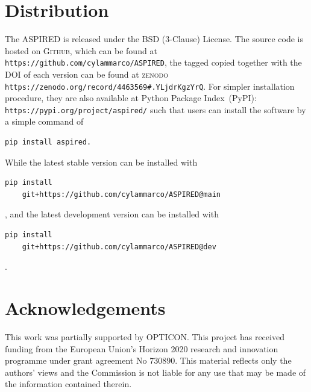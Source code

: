 \documentclass[fleqn,usenatbib]{mnras}
\begin{document}






\section{Distribution}
The \textsc{ASPIRED} is released under the BSD (3-Clause) License. The
source code is hosted on \textsc{Github}, which can be found at
\verb+https://github.com/cylammarco/ASPIRED+, the tagged copied together
with the DOI of each version can be found at
\textsc{zenodo} \verb+https://zenodo.org/record/4463569#.YLjdrKgzYrQ+.
For simpler installation procedure, they are also available at Python
Package Index~(PyPI): \verb+https://pypi.org/project/aspired/+ such that
users can install the software by a simple command of 
\begin{verbatim}
pip install aspired.
\end{verbatim}
While the latest stable version can be installed with
\begin{verbatim}
pip install 
    git+https://github.com/cylammarco/ASPIRED@main
\end{verbatim},
and the latest development version can be installed with 
\begin{verbatim}
pip install 
    git+https://github.com/cylammarco/ASPIRED@dev
\end{verbatim}.

\section*{Acknowledgements}
This work was partially supported by OPTICON. This project has
received funding from the European Union’s Horizon 2020 research and
innovation programme under grant agreement No 730890. This material
reflects only the authors' views and the Commission is not liable for
any use that may be made of the information contained therein.
\end{document}
